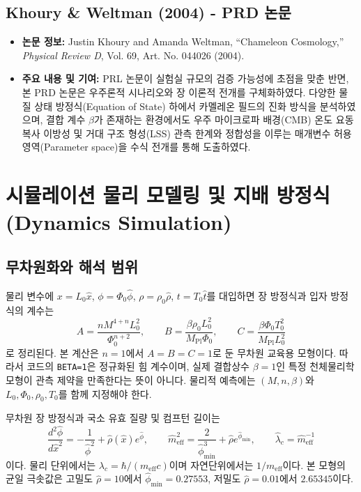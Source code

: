 \documentclass[11pt, a4paper]{article}
\begin{document}
\subsection{Khoury \& Weltman (2004) - PRD 논문}
\begin{itemize}
    \item \textbf{논문 정보:} Justin Khoury and Amanda Weltman, ``Chameleon Cosmology,'' \textit{Physical Review D}, Vol. 69, Art. No. 044026 (2004)\cite{Khoury2004prd}.
    \item \textbf{주요 내용 및 기여:}
    PRL 논문이 실험실 규모의 검증 가능성에 초점을 맞춘 반면, 본 PRD 논문은 우주론적 시나리오와 장 이론적 전개를 구체화하였다.
    다양한 물질 상태 방정식(Equation of State) 하에서 카멜레온 필드의 진화 방식을 분석하였으며, 결합 계수 $\beta$가 존재하는 환경에서도 우주 마이크로파 배경(CMB) 온도 요동 복사 이방성 및 거대 구조 형성(LSS) 관측 한계와 정합성을 이루는 매개변수 허용 영역(Parameter space)을 수식 전개를 통해 도출하였다.
\end{itemize}

\section{시뮬레이션 물리 모델링 및 지배 방정식 (Dynamics Simulation)}

\subsection{무차원화와 해석 범위}
물리 변수에 $x=L_0\hat{x}$, $\phi=\Phi_0\hat{\phi}$, $\rho=\rho_0\hat{\rho}$, $t=T_0\hat{t}$를 대입하면 장 방정식과 입자 방정식의 계수는
\begin{equation}
 A=\frac{nM^{4+n}L_0^2}{\Phi_0^{n+2}},\qquad
 B=\frac{\beta\rho_0L_0^2}{M_{\mathrm{Pl}}\Phi_0},\qquad
 C=\frac{\beta\Phi_0T_0^2}{M_{\mathrm{Pl}}L_0^2}
\end{equation}
로 정리된다. 본 계산은 $n=1$에서 $A=B=C=1$로 둔 무차원 교육용 모형이다. 따라서 코드의 \texttt{BETA=1}은 정규화된 힘 계수이며, 실제 결합상수 $\beta=1$인 특정 천체물리학 모형이 관측 제약을 만족한다는 뜻이 아니다. 물리적 예측에는 $(M,n,\beta)$와 $L_0,\Phi_0,\rho_0,T_0$를 함께 지정해야 한다.

무차원 장 방정식과 국소 유효 질량 및 컴프턴 길이는
\begin{equation}
 \frac{d^2\hat{\phi}}{d\hat{x}^2}=-\frac{1}{\hat{\phi}^2}+\hat{\rho}(\hat{x})e^{\hat{\phi}},\qquad
 \hat{m}_{\mathrm{eff}}^2=\frac{2}{\hat{\phi}_{\min}^3}+\hat{\rho}e^{\hat{\phi}_{\min}},\qquad
 \hat{\lambda}_c=\hat{m}_{\mathrm{eff}}^{-1}
\end{equation}
이다. 물리 단위에서는 $\lambda_c=\hbar/(m_{\mathrm{eff}}c)$이며 자연단위에서는 $1/m_{\mathrm{eff}}$이다. 본 모형의 균일 극솟값은 고밀도 $\hat{\rho}=10$에서 $\hat{\phi}_{\min}=0.27553$, 저밀도 $\hat{\rho}=0.01$에서 $2.65345$이다.
\end{document}
